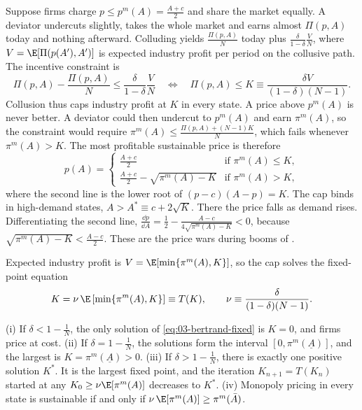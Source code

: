 Suppose firms charge $p \le p^m(A) = \frac{A + c}{2}$ and share the market equally. A deviator undercuts slightly, takes the
whole market and earns almost $\Pi(p, A)$ today and nothing afterward. Colluding yields $\frac{\Pi(p, A)}{N}$ today plus
$\frac{\delta}{1 - \delta}\frac{V}{N}$, where $V = \E[\Pi(p(A'), A')]$ is expected industry profit per period on the
collusive path. The incentive constraint is
\begin{equation*}
\Pi(p, A) - \frac{\Pi(p, A)}{N} \le \frac{\delta}{1 - \delta}\frac{V}{N}
\quad\Longleftrightarrow\quad
\Pi(p, A) \le K \equiv \frac{\delta V}{(1 - \delta)(N - 1)} .
\end{equation*}
Collusion thus caps industry profit at $K$ in every state. A price above $p^m(A)$ is never better. A deviator could then
undercut to $p^m(A)$ and earn $\pi^m(A)$, so the constraint would require $\pi^m(A) \le \frac{\Pi(p, A) + (N - 1)K}{N}$,
which fails whenever $\pi^m(A) > K$. The most profitable sustainable price is therefore
\begin{equation}\label{eq:03-bertrand-price}
p(A) =
\begin{cases}
\frac{A + c}{2} & \text{if } \pi^m(A) \le K ,\\[3pt]
\frac{A + c}{2} - \sqrt{\pi^m(A) - K} & \text{if } \pi^m(A) > K ,
\end{cases}
\end{equation}
where the second line is the lower root of $(p - c)(A - p) = K$. The cap binds in high-demand states, $A > A^* \equiv c +
2\sqrt K$. There the price falls as demand rises. Differentiating the second line,
$\frac{\dd p}{\dd A} = \frac{1}{2} - \frac{A - c}{4\sqrt{\pi^m(A) - K}} < 0$, because $\sqrt{\pi^m(A) - K} < \frac{A - c}{2}$.
These are the price wars during booms of \citet{RotembergSaloner1986}.

Expected industry profit is $V = \E[\min\{\pi^m(A), K\}]$, so the cap solves the fixed-point equation
\begin{equation}\label{eq:03-bertrand-fixed}
K = \nu\, \E\left[\min\{\pi^m(A), K\}\right] \equiv T(K), \qquad \nu \equiv \frac{\delta}{(1 - \delta)(N - 1)} .
\end{equation}

\begin{lemma}\label{lem:03-fixed-point}
(i) If $\delta < 1 - \frac{1}{N}$, the only solution of \eqref{eq:03-bertrand-fixed} is $K = 0$, and firms price at cost.
(ii) If $\delta = 1 - \frac{1}{N}$, the solutions form the interval $[0, \pi^m(\underline A)]$, and the largest is
$K = \pi^m(\underline A) > 0$. (iii) If $\delta > 1 - \frac{1}{N}$, there is exactly one positive solution $K^*$. It is the
largest fixed point, and the iteration $K_{n+1} = T(K_n)$ started at any $K_0 \ge \nu\E[\pi^m(A)]$ decreases to $K^*$.
(iv) Monopoly pricing in every state is sustainable if and only if $\nu\,\E[\pi^m(A)] \ge \pi^m(\bar A)$.
\end{lemma}

